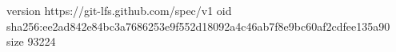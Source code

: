 version https://git-lfs.github.com/spec/v1
oid sha256:ee2ad842e84bc3a7686253e9f552d18092a4c46ab7f8e9bc60af2cdfee135a90
size 93224
